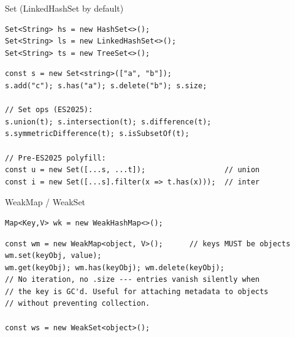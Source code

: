 \documentclass[10pt]{article}
\begin{document}
\begin{construct}{Set (LinkedHashSet by default)}
\noindent
\begin{minipage}[t]{0.485\linewidth}
\begin{lstlisting}[style=java, title=Java]
Set<String> hs = new HashSet<>();
Set<String> ls = new LinkedHashSet<>();
Set<String> ts = new TreeSet<>();
\end{lstlisting}
\end{minipage}\hfill
\begin{minipage}[t]{0.485\linewidth}
\begin{lstlisting}[style=ts, title=TypeScript]
const s = new Set<string>(["a", "b"]);
s.add("c"); s.has("a"); s.delete("b"); s.size;

// Set ops (ES2025):
s.union(t); s.intersection(t); s.difference(t);
s.symmetricDifference(t); s.isSubsetOf(t);

// Pre-ES2025 polyfill:
const u = new Set([...s, ...t]);                  // union
const i = new Set([...s].filter(x => t.has(x)));  // inter
\end{lstlisting}
\end{minipage}
\end{construct}


\begin{construct}{WeakMap / WeakSet}
\noindent
\begin{minipage}[t]{0.485\linewidth}
\begin{lstlisting}[style=java, title=Java]
Map<Key,V> wk = new WeakHashMap<>();
\end{lstlisting}
\end{minipage}\hfill
\begin{minipage}[t]{0.485\linewidth}
\begin{lstlisting}[style=ts, title=TypeScript]
const wm = new WeakMap<object, V>();      // keys MUST be objects
wm.set(keyObj, value);
wm.get(keyObj); wm.has(keyObj); wm.delete(keyObj);
// No iteration, no .size --- entries vanish silently when
// the key is GC'd. Useful for attaching metadata to objects
// without preventing collection.

const ws = new WeakSet<object>();
\end{lstlisting}
\end{minipage}
\end{construct}

\end{document}
